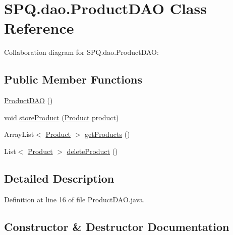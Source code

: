 \hypertarget{class_s_p_q_1_1dao_1_1_product_d_a_o}{}\section{S\+P\+Q.\+dao.\+Product\+D\+AO Class Reference}
\label{class_s_p_q_1_1dao_1_1_product_d_a_o}


Collaboration diagram for S\+P\+Q.\+dao.\+Product\+D\+AO\+:
\subsection*{Public Member Functions}
\begin{DoxyCompactItemize}
\item 
\mbox{\hyperlink{class_s_p_q_1_1dao_1_1_product_d_a_o_a16f6ce4efaca2c8d52d9af93d7cb6d1c}{Product\+D\+AO}} ()
\item 
void \mbox{\hyperlink{class_s_p_q_1_1dao_1_1_product_d_a_o_ae890d625011f3c28730259820c9f4f3c}{store\+Product}} (\mbox{\hyperlink{class_s_p_q_1_1data_1_1_product}{Product}} product)
\item 
Array\+List$<$ \mbox{\hyperlink{class_s_p_q_1_1data_1_1_product}{Product}} $>$ \mbox{\hyperlink{class_s_p_q_1_1dao_1_1_product_d_a_o_addd0016628e2b0db06969de5a944eace}{get\+Products}} ()
\item 
List$<$ \mbox{\hyperlink{class_s_p_q_1_1data_1_1_product}{Product}} $>$ \mbox{\hyperlink{class_s_p_q_1_1dao_1_1_product_d_a_o_acdc252858b17b13fe9677aa1a455bef3}{delete\+Product}} ()
\end{DoxyCompactItemize}


\subsection{Detailed Description}


Definition at line 16 of file Product\+D\+A\+O.\+java.



\subsection{Constructor \& Destructor Documentation}
\mbox{\label{class_s_p_q_1_1dao_1_1_product_d_a_o_a16f6ce4efaca2c8d52d9af93d7cb6d1c}} 
